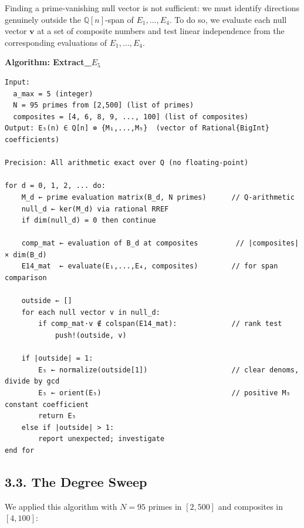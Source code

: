 \documentclass[
  11pt,
]{article}
\begin{document}
Finding a prime-vanishing null vector is not sufficient: we must
identify directions genuinely outside the \(\mathbb{Q}[n]\)-span of
\(E_1,\ldots,E_4\). To do so, we evaluate each null vector
\(\mathbf{v}\) at a set of composite numbers and test linear
independence from the corresponding evaluations of \(E_1,\ldots,E_4\).

\textbf{Algorithm: Extract\_\(E_5\)}

{\small\begin{verbatim}
Input:
  a_max = 5 (integer)
  N = 95 primes from [2,500] (list of primes)
  composites = [4, 6, 8, 9, ..., 100] (list of composites)
Output: E₅(n) ∈ Q[n] ⊗ {M₁,...,M₅}  (vector of Rational{BigInt} coefficients)

Precision: All arithmetic exact over Q (no floating-point)

for d = 0, 1, 2, ... do:
    M_d ← prime evaluation matrix(B_d, N primes)      // Q-arithmetic
    null_d ← ker(M_d) via rational RREF
    if dim(null_d) = 0 then continue

    comp_mat ← evaluation of B_d at composites         // |composites| × dim(B_d)
    E14_mat  ← evaluate(E₁,...,E₄, composites)        // for span comparison

    outside ← []
    for each null vector v in null_d:
        if comp_mat·v ∉ colspan(E14_mat):             // rank test
            push!(outside, v)

    if |outside| = 1:
        E₅ ← normalize(outside[1])                    // clear denoms, divide by gcd
        E₅ ← orient(E₅)                               // positive M₅ constant coefficient
        return E₅
    else if |outside| > 1:
        report unexpected; investigate
end for
\end{verbatim}}

\subsection{3.3. The Degree Sweep}\label{the-degree-sweep}

We applied this algorithm with \(N = 95\) primes in \([2,500]\) and
composites in \([4,100]\):
\end{document}
